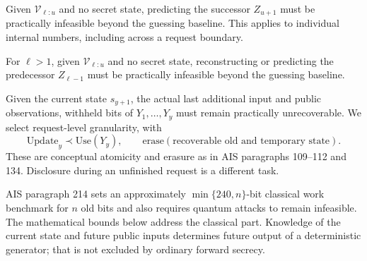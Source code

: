 \documentclass[journal=tosc,preprint,floatrow,nohyperxmp]{iacrtrans}
\numberwithin{lemma}{section}
\numberwithin{proposition}{section}
\numberwithin{equation}{section}
\theoremstyle{definition}
\numberwithin{definition}{section}
\theoremstyle{plain}
\begin{document}
\begin{definition}\label{def:forward}
Given $\mathcal V_{\ell:u}$ and no secret state, predicting the successor $Z_{u+1}$ must be practically infeasible beyond the guessing baseline. This applies to individual internal numbers, including across a request boundary.
\end{definition}
\begin{definition}\label{def:backward}
For $\ell>1$, given $\mathcal V_{\ell:u}$ and no secret state, reconstructing or predicting the predecessor $Z_{\ell-1}$ must be practically infeasible beyond the guessing baseline.
\end{definition}
\begin{definition}\label{def:enhanced}
Given the current state $s_{y+1}$, the actual last additional input and public observations, withheld bits of $Y_1,\ldots,Y_y$ must remain practically unrecoverable. We select request-level granularity, with
\[
 \mathrm{Update}_y\prec\mathrm{Use}(Y_y),
 \qquad \mathrm{erase}(\text{recoverable old and temporary state}).
\]
These are conceptual atomicity and erasure as in AIS paragraphs 109--112 and 134. Disclosure during an unfinished request is a different task.
\end{definition}
AIS paragraph 214 sets an approximately $\min\{240,n\}$-bit classical work benchmark for $n$ old bits and also requires quantum attacks to remain infeasible. The mathematical bounds below address the classical part. Knowledge of the current state and future public inputs determines future output of a deterministic generator; that is not excluded by ordinary forward secrecy.
\end{document}
